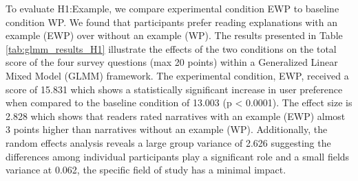 
To evaluate H1:Example, we compare experimental condition EWP to baseline condition WP. We found that participants prefer reading explanations with an example (EWP) over without an example (WP).
The results presented in Table \ref{tab:glmm_results_H1} illustrate the effects of the two conditions on the total score of the four survey questions (max 20 points) within a Generalized Linear Mixed Model (GLMM) framework. The experimental condition, EWP, received a score of 15.831 which shows a statistically significant increase in user preference when compared to the baseline condition of 13.003 (p < 0.0001). The effect size is 2.828 which shows that readers rated narratives with an example (EWP) almost 3 points higher than narratives without an example (WP). Additionally, the random effects analysis reveals a large group variance of 2.626 suggesting the differences among individual participants play a significant role and a small fields variance at 0.062, the specific field of study has a minimal impact. 



